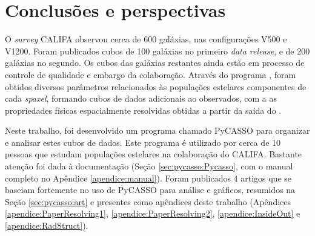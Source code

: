 



\chapter{Conclusões e perspectivas}
\label{sec:conclusao}

O {\em survey} CALIFA observou cerca de 600 galáxias, nas configurações V500 e
V1200. Foram publicados cubos de 100 galáxias no primeiro {\em data release}, e
de 200 galáxias no segundo. Os cubos das galáxias restantes ainda estão em
processo de controle de qualidade e embargo da colaboração. Através do programa
\starlight, foram obtidos diversos parâmetros relacionados às populações
estelares componentes de cada {\em spaxel}, formando cubos de dados adicionais
ao observados, com a as propriedades físicas espacialmente resolvidas obtidas a
partir da saída do \starlight.

Neste trabalho, foi desenvolvido um programa chamado PyCASSO para organizar e
analisar estes cubos de dados. Este programa é utilizado por cerca de 10 pessoas
que estudam populações estelares na colaboração do CALIFA. Bastante atenção foi
dada à documentação (Seção \ref{sec:pycasso:Pycasso}, com o manual completo no
Apêndice \ref{apendice:manual}). Foram publicados 4 artigos que se baseiam
fortemente no uso de PyCASSO para análise e gráficos, resumidos na Seção
\ref{sec:pycasso:art} e presentes como apêndices deste trabalho (Apêndices
\ref{apendice:PaperResolving1}, \ref{apendice:PaperResolving2},
\ref{apendice:InsideOut} e \ref{apendice:RadStruct}).

